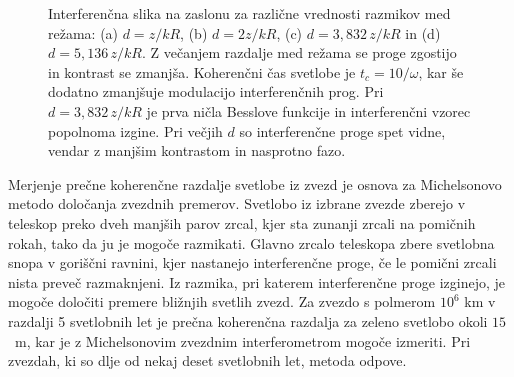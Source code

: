 \begin{figure}[h]
\begin{center}
\def\svgwidth{0.37\textwidth} 

\def\svgwidth{0.37\textwidth} 

\def\svgwidth{0.37\textwidth} 

\def\svgwidth{0.37\textwidth} 

\caption{Interferenčna slika na zaslonu
za različne vrednosti razmikov med režama: (a) $d = z/kR$, (b) $d=2z/kR$, 
(c) $d = 3,832\,z/kR$ in (d) $d = 5,136\,z/kR$. 
Z večanjem razdalje med režama se proge zgostijo in kontrast se zmanjša. Koherenčni
čas svetlobe je $t_{c}=10/\omega$, kar še dodatno zmanjšuje modulacijo
interferenčnih prog. Pri $d=3,832\,z/kR$ je prva ničla Besslove
funkcije in interferenčni vzorec popolnoma izgine. Pri večjih $d$ so interferenčne
proge spet vidne, vendar z manjšim kontrastom in nasprotno fazo.}
\label{fig:Interferencna-slika}
\end{center}
\end{figure}

\begin{remark}
Merjenje prečne koherenčne razdalje svetlobe iz
zvezd je osnova za Michelsonovo metodo določanja zvezdnih premerov.
Svetlobo iz izbrane zvezde zberejo v teleskop preko dveh manjših parov
zrcal, kjer sta zunanji zrcali na pomičnih rokah, tako da ju je mogoče
razmikati. Glavno zrcalo teleskopa zbere svetlobna snopa v goriščni
ravnini, kjer nastanejo interferenčne proge, če le pomični zrcali
nista preveč razmaknjeni. Iz razmika, pri katerem interferenčne proge
izginejo, je mogoče določiti premere bližnjih svetlih zvezd. Za zvezdo
s polmerom $10^{6}$ km v razdalji 5 svetlobnih let je prečna koherenčna
razdalja za zeleno svetlobo okoli $15$~m, kar je z Michelsonovim
zvezdnim interferometrom mogoče izmeriti. Pri zvezdah, ki so dlje
od nekaj deset svetlobnih let, metoda odpove.
\end{remark}

